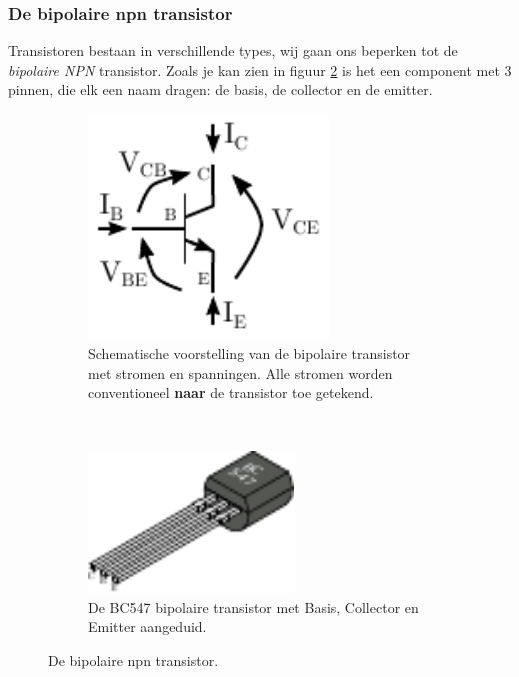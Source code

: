 \documentclass{article}
\begin{document}
			
			\subsubsection{De bipolaire npn transistor}
				 Transistoren bestaan in verschillende types, wij gaan ons beperken tot de \emph{bipolaire NPN} transistor. Zoals je kan zien in figuur \ref{subfig:transistor_bce} is het een component met 3 pinnen, die elk een naam dragen: de basis, de collector en de emitter.
				\begin{figure}[htbp]
				\centering
					\begin{subfigure}[b]{0.45\linewidth}
						\centering
					\includegraphics[width=0.7\textwidth]{transistor_VI}
					\caption{Schematische voorstelling van de bipolaire transistor met stromen en spanningen. Alle stromen worden conventioneel \textbf{naar} de transistor toe getekend.}
					\label{subfig:transistor_vi}
					\end{subfigure}
					~
					\begin{subfigure}[b]{0.45\linewidth}
						\centering
						\includegraphics[width=0.6\textwidth]{transistor}
						\caption{De BC547 bipolaire transistor met Basis, Collector en Emitter aangeduid.}
						\label{subfig:transistor_bce}
					\end{subfigure}
					
					\caption{De bipolaire npn transistor.}
					\label{fig:transistor}
				\end{figure}
\end{document}
